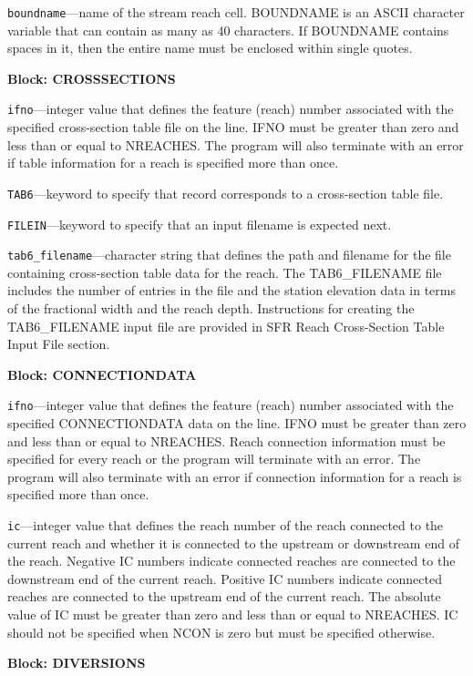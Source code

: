 \begin{description}
\item \texttt{boundname}---name of the stream reach cell.  BOUNDNAME is an ASCII character variable that can contain as many as 40 characters.  If BOUNDNAME contains spaces in it, then the entire name must be enclosed within single quotes.

\end{description}
\item \textbf{Block: CROSSSECTIONS}

\begin{description}
\item \texttt{ifno}---integer value that defines the feature (reach) number associated with the specified cross-section table file on the line. IFNO must be greater than zero and less than or equal to NREACHES. The program will also terminate with an error if table information for a reach is specified more than once.

\item \texttt{TAB6}---keyword to specify that record corresponds to a cross-section table file.

\item \texttt{FILEIN}---keyword to specify that an input filename is expected next.

\item \texttt{tab6\_filename}---character string that defines the path and filename for the file containing cross-section table data for the reach. The TAB6\_FILENAME file includes the number of entries in the file and the station elevation data in terms of the fractional width and the reach depth. Instructions for creating the TAB6\_FILENAME input file are provided in SFR Reach Cross-Section Table Input File section.

\end{description}
\item \textbf{Block: CONNECTIONDATA}

\begin{description}
\item \texttt{ifno}---integer value that defines the feature (reach) number associated with the specified CONNECTIONDATA data on the line. IFNO must be greater than zero and less than or equal to NREACHES. Reach connection information must be specified for every reach or the program will terminate with an error.  The program will also terminate with an error if connection information for a reach is specified more than once.

\item \texttt{ic}---integer value that defines the reach number of the reach connected to the current reach and whether it is connected to the upstream or downstream end of the reach. Negative IC numbers indicate connected reaches are connected to the downstream end of the current reach. Positive IC numbers indicate connected reaches are connected to the upstream end of the current reach. The absolute value of IC must be greater than zero and less than or equal to NREACHES. IC should not be specified when NCON is zero but must be specified otherwise.

\end{description}
\item \textbf{Block: DIVERSIONS}

